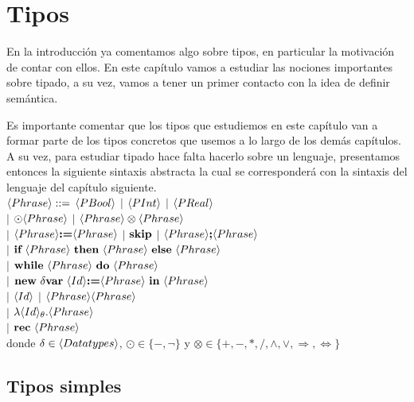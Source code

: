 \chapter{Tipos}
\label{chap:types}

En la introducci\'on ya comentamos algo sobre tipos, en particular la 
motivaci\'on de contar con ellos. En este cap\'itulo vamos a estudiar las 
nociones importantes sobre tipado, a su vez, vamos a tener un primer contacto
con la idea de definir sem\'antica. \

Es importante comentar que los tipos que estudiemos en este cap\'itulo van
a formar parte de los tipos concretos que usemos a lo largo de los dem\'as
cap\'itulos. A su vez, para estudiar tipado hace falta hacerlo sobre un
lenguaje, presentamos entonces la siguiente sintaxis abstracta la cual
se corresponder\'a con la sintaxis del lenguaje del cap\'itulo siguiente. \\

\noindent
$\langle Phrase \rangle ::=$ $\langle PBool \rangle$ $|$ $\langle PInt \rangle$ $|$ $\langle PReal \rangle$ \\
\indent \indent \indent $|$ 
$\odot \langle Phrase \rangle$ $|$ $\langle Phrase \rangle \otimes \langle Phrase \rangle $ \\ 
\indent \indent \indent $|$ 
$\langle Phrase \rangle \textbf{:=} \langle Phrase \rangle$ $|$ $\textbf{skip}$ $|$ $\langle Phrase \rangle \textbf{;} \langle Phrase \rangle$ \\ 
\indent \indent \indent $|$ 
$\textbf{if} \ \langle Phrase \rangle \ \textbf{then} \ \langle Phrase \rangle \ \textbf{else} \ \langle Phrase \rangle$ \\ 
\indent \indent \indent $|$ 
$\textbf{while} \ \langle Phrase \rangle \ \textbf{do} \ \langle Phrase \rangle$ \\ 
\indent \indent \indent $|$ 
$\textbf{new} \ \delta \textbf{var} \ \langle Id \rangle \textbf{:=} \langle Phrase \rangle \ \textbf{in} \ \langle Phrase \rangle$ \\ 
\indent \indent \indent $|$ 
$\langle Id \rangle$ $|$ $\langle Phrase \rangle\langle Phrase \rangle$ \\
\indent \indent \indent $|$ 
$\lambda \langle Id \rangle_{\theta} . \langle Phrase \rangle $ \\
\indent \indent \indent $|$ 
$\textbf{rec} \ \langle Phrase \rangle$
\\

donde $\delta \in \langle Data types \rangle$, $\odot \in \{-, \neg\}$ y 
$\otimes \in \{+,-,*,/,\wedge,\vee,\Rightarrow,\Leftrightarrow\}$

\section{Tipos simples}

